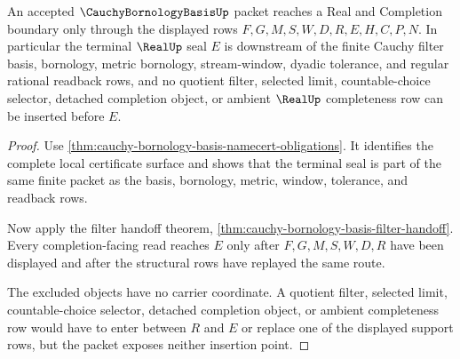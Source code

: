 \begin{theorem}
\label{thm:cauchy-bornology-basis-real-completion-boundary}
An accepted $\CauchyBornologyBasisUp$ packet reaches a Real and Completion boundary only through the displayed rows $F,G,M,S,W,D,R,E,H,C,P,N$. In particular the terminal $\RealUp$ seal $E$ is downstream of the finite Cauchy filter basis, bornology, metric bornology, stream-window, dyadic tolerance, and regular rational readback rows, and no quotient filter, selected limit, countable-choice selector, detached completion object, or ambient $\RealUp$ completeness row can be inserted before $E$.
\end{theorem}
\begin{proof}
Use \autoref{thm:cauchy-bornology-basis-namecert-obligations}. It identifies the complete local certificate surface and shows that the terminal seal is part of the same finite packet as the basis, bornology, metric, window, tolerance, and readback rows.

Now apply the filter handoff theorem, \autoref{thm:cauchy-bornology-basis-filter-handoff}. Every completion-facing read reaches $E$ only after $F,G,M,S,W,D,R$ have been displayed and after the structural rows have replayed the same route.

The excluded objects have no carrier coordinate. A quotient filter, selected limit, countable-choice selector, detached completion object, or ambient completeness row would have to enter between $R$ and $E$ or replace one of the displayed support rows, but the packet exposes neither insertion point.
\end{proof}




